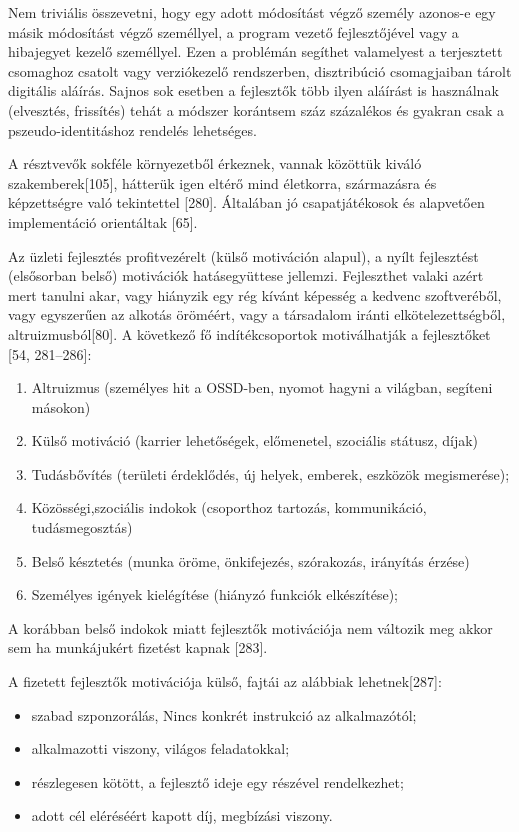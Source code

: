 \documentclass[12pt,magyar,a4paper,oneside]{scrreprt}
\providecommand{\tightlist}{%
  \setlength{\itemsep}{0pt}\setlength{\parskip}{0pt}}
\begin{document}
Nem triviális összevetni, hogy egy adott módosítást végző személy
azonos-e egy másik módosítást végző személlyel, a program vezető
fejlesztőjével vagy a hibajegyet kezelő személlyel. Ezen a problémán
segíthet valamelyest a terjesztett csomaghoz csatolt vagy verziókezelő
rendszerben, disztribúció csomagjaiban tárolt digitális aláírás. Sajnos
sok esetben a fejlesztők több ilyen aláírást is használnak (elvesztés,
frissítés) tehát a módszer korántsem száz százalékos és gyakran csak a
pszeudo-identitáshoz rendelés lehetséges.

A résztvevők sokféle környezetből érkeznek, vannak közöttük kiváló
szakemberek{[}105{]}, hátterük igen eltérő mind életkorra, származásra
és képzettségre való tekintettel {[}280{]}. Általában jó csapatjátékosok
és alapvetően implementáció orientáltak {[}65{]}.

Az üzleti fejlesztés profitvezérelt (külső motiváción alapul), a nyílt
fejlesztést (elsősorban belső) motivációk hatásegyüttese jellemzi.
Fejleszthet valaki azért mert tanulni akar, vagy hiányzik egy rég kívánt
képesség a kedvenc szoftveréből, vagy egyszerűen az alkotás öröméért,
vagy a társadalom iránti elkötelezettségből, altruizmusból{[}80{]}. A
következő fő indítékcsoportok motiválhatják a fejlesztőket {[}54,
281--286{]}:

\begin{enumerate}
\def\labelenumi{\arabic{enumi}.}
\tightlist
\item
  Altruizmus (személyes hit a OSSD-ben, nyomot hagyni a világban,
  segíteni másokon)
\item
  Külső motiváció (karrier lehetőségek, előmenetel, szociális státusz,
  díjak)
\item
  Tudásbővítés (területi érdeklődés, új helyek, emberek, eszközök
  megismerése);
\item
  Közösségi,szociális indokok (csoporthoz tartozás, kommunikáció,
  tudásmegosztás)
\item
  Belső késztetés (munka öröme, önkifejezés, szórakozás, irányítás
  érzése)
\item
  Személyes igények kielégítése (hiányzó funkciók elkészítése);
\end{enumerate}

A korábban belső indokok miatt fejlesztők motivációja nem változik meg
akkor sem ha munkájukért fizetést kapnak {[}283{]}.

A fizetett fejlesztők motivációja külső, fajtái az alábbiak
lehetnek{[}287{]}:

\begin{itemize}
\tightlist
\item
  szabad szponzorálás, Nincs konkrét instrukció az alkalmazótól;
\item
  alkalmazotti viszony, világos feladatokkal;
\item
  részlegesen kötött, a fejlesztő ideje egy részével rendelkezhet;
\item
  adott cél eléréséért kapott díj, megbízási viszony.
\end{itemize}
\end{document}
